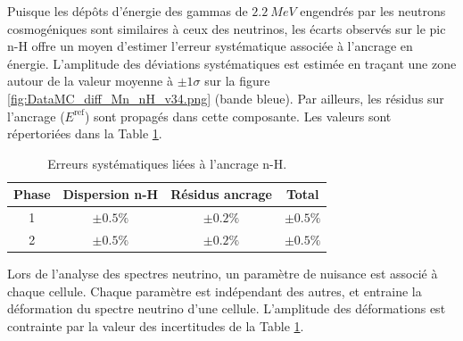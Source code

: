 Puisque les dépôts d'énergie des gammas de $\SI{2.2}{MeV}$ engendrés par les neutrons cosmogéniques sont similaires à ceux des neutrinos, les écarts observés sur le pic n-H offre un moyen d'estimer l'erreur systématique associée à l'ancrage en énergie. L'amplitude des déviations systématiques est estimée en traçant une zone autour de la valeur moyenne à $\pm 1\sigma$ sur la figure \ref{fig:DataMC_diff_Mn_nH_v34.png} (bande bleue). Par ailleurs, les résidus sur l'ancrage ($E^\textrm{ref}$) sont propagés dans cette composante. Les valeurs sont répertoriées dans la Table \ref{tab:dE_uncorr}. \\

\begin{table}[h!]
  \begin{center}
    \begin{tabular}{|c|c|c|c|}
      \hline
      Phase & Dispersion n-H & Résidus ancrage & Total\\
      \hline
      1 & $\pm 0.5 \%$ & $\pm 0.2 \%$ & $\pm 0.5 \%$\\
      \hline
      2 & $\pm 0.5 \%$ & $\pm 0.2 \%$ & $\pm 0.5 \%$\\
      \hline
    \end{tabular}
  \end{center}
  \caption{Erreurs systématiques liées à l'ancrage n-H.}
    \label{tab:dE_uncorr}
\end{table}


\bigbreak

Lors de l'analyse des spectres neutrino, un paramètre de nuisance est associé à chaque cellule. Chaque paramètre est indépendant des autres, et entraine la déformation du spectre neutrino d'une cellule. L'amplitude des déformations est contrainte par la valeur des incertitudes de la Table \ref{tab:dE_uncorr}.




%

